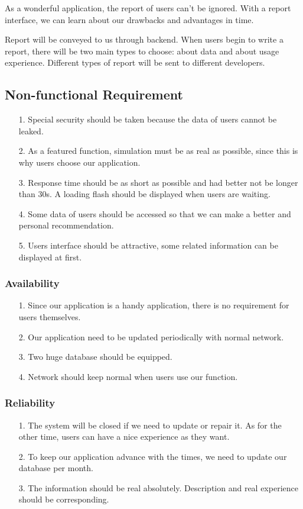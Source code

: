 \documentclass[10pt]{article}
\begin{document}
As a wonderful application, the report of users can’t be ignored. With a report interface, we can learn about our drawbacks and advantages in time.

Report will be conveyed to us through backend. When users begin to write a report, there will be two main types to choose: about data and about usage experience. Different types of report will be sent to different developers. 

\subsection{Non-functional Requirement}
\begin{itemize}
	\item[1.]Special security should be taken because the data of users cannot be leaked.
	\item[2.] As a featured function, simulation must be as real as possible, since this is why users choose our application.
	\item[3.]  Response time should be as short as possible and had better not be longer than 30s. A loading flash should be displayed when users are waiting.
	\item[4.] Some data of users should be accessed so that we can make a better and personal recommendation.
	\item[5.]Users interface should be attractive, some related information can be displayed at first.
\end{itemize}

\subsubsection{Availability}
\begin{itemize}
	\item[1.] Since our application is a handy application, there is no requirement for users themselves.
	\item[2.] Our application need to be updated periodically with normal network.
	\item[3.] Two huge database should be equipped.
	\item[4.] Network should keep normal when users use our function.
\end{itemize}

\subsubsection{Reliability}
\begin{itemize}
	\item[1.] The system will be closed if we need to update or repair it. As for the other time, users can have a nice experience as they want. 
	\item[2.]To keep our application advance with the times, we need to update our database per month. 
	\item[3.] The information should be real absolutely. Description and real experience should be corresponding. 
\end{itemize}
\end{document}
